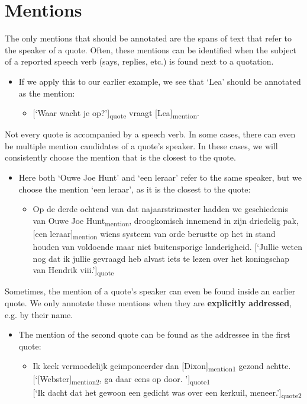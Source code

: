 \section{Mentions}
The only mentions that should be annotated are the spans of text that refer to the speaker of a quote. Often, these mentions can be identified when the subject
of a reported speech verb (says, replies, etc.) is found next to a quotation. 

\begin{itemize}
\item If we apply this to our earlier example, we see that `Lea' should be annotated as the mention:
    \begin{itemize}[label={}]
        \item {[}`Waar wacht je op?'{]}\textsubscript{quote} vraagt [Lea]\textsubscript{mention}.
    \end{itemize}
\end{itemize}

\noindent Not every quote is accompanied by a speech verb. In some cases, there can even be multiple mention candidates of a quote's speaker. In these cases, we will consistently choose the mention that is the closest to the quote.

\begin{itemize}
\item Here both `Ouwe Joe Hunt' and `een leraar' refer to the same speaker, but we choose the mention `een leraar', as it is the closest to the quote:
    \begin{itemize}[label={}]
        \item Op de derde ochtend van dat najaarstrimester hadden we geschiedenis van \n{[}Ouwe Joe Hunt\n{]}\textsubscript{mention}, droogkomisch innemend in zijn driedelig pak, [een leraar]\textsubscript{mention} wiens systeem van orde berustte op het in stand houden van voldoende maar niet buitensporige landerigheid. {[}`Jullie weten nog dat ik jullie gevraagd heb alvast iets te lezen over het koningschap van Hendrik viii.'{]}\textsubscript{quote}
    \end{itemize}
\end{itemize}

\noindent Sometimes, the mention of a quote's speaker can even be found inside an earlier quote. We only annotate these mentions when they are \textbf{explicitly addressed}, e.g. by their name.
\begin{itemize}
\item The mention of the second quote can be found as the addressee in the first quote:
    \begin{itemize}[label={}]
        \item Ik keek vermoedelijk geimponeerder dan {[}Dixon{]}\textsubscript{mention1} gezond achtte.
        {[}`[Webster]\textsubscript{mention2}, ga daar eens op door. '{]}\textsubscript{quote1} \\
        {[}`Ik dacht dat het gewoon een gedicht was over een kerkuil, meneer.'{]}\textsubscript{quote2}
    \end{itemize}
\end{itemize}

